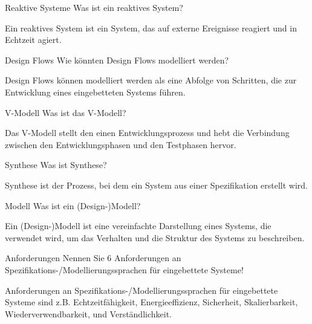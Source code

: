 \documentclass{article}
\begin{document}
\begin{exercise}{Reaktive Systeme}
  Was ist ein reaktives System?

  \begin{solution}
    Ein reaktives System ist ein System, das auf externe Ereignisse reagiert und in Echtzeit agiert.
  \end{solution}
\end{exercise}

\begin{exercise}{Design Flows}
  Wie könnten Design Flows modelliert werden?

  \begin{solution}
    Design Flows können modelliert werden als eine Abfolge von Schritten, die zur Entwicklung eines eingebetteten Systems führen.
  \end{solution}
\end{exercise}

\begin{exercise}{V-Modell}
  Was ist das V-Modell?

  \begin{solution}
    Das V-Modell stellt den einen Entwicklungsprozess und hebt die Verbindung zwischen den Entwicklungsphasen und den Testphasen hervor.
  \end{solution}
\end{exercise}

\begin{exercise}{Synthese}
  Was ist Synthese?

  \begin{solution}
    Synthese ist der Prozess, bei dem ein System aus einer Spezifikation erstellt wird.
  \end{solution}
\end{exercise}


\begin{exercise}{Modell}
  Was ist ein (Design-)Modell?

  \begin{solution}
    Ein (Design-)Modell ist eine vereinfachte Darstellung eines Systems, die verwendet wird, um das Verhalten und die Struktur des Systems zu beschreiben.
  \end{solution}
\end{exercise}

\begin{exercise}{Anforderungen}
  Nennen Sie 6 Anforderungen an Spezifikations-/Modellierungssprachen für eingebettete Systeme!

  \begin{solution}
    Anforderungen an Spezifikations-/Modellierungssprachen für eingebettete Systeme sind z.B. Echtzeitfähigkeit, Energieeffizienz, Sicherheit, Skalierbarkeit, Wiederverwendbarkeit, und Verständlichkeit.
  \end{solution}
\end{exercise}
\end{document}
